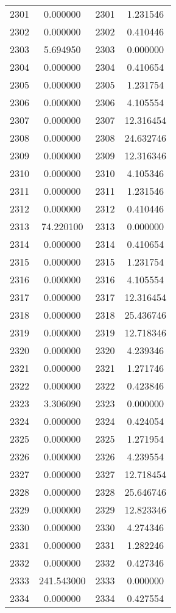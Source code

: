 \documentclass[12pt]{article}
\begin{document}
\begin{longtable}{@{}cccc@{}}
2301 & 0.000000 & 2301 & 1.231546 \\
2302 & 0.000000 & 2302 & 0.410446 \\
2303 & 5.694950 & 2303 & 0.000000 \\
2304 & 0.000000 & 2304 & 0.410654 \\
2305 & 0.000000 & 2305 & 1.231754 \\
2306 & 0.000000 & 2306 & 4.105554 \\
2307 & 0.000000 & 2307 & 12.316454 \\
2308 & 0.000000 & 2308 & 24.632746 \\
2309 & 0.000000 & 2309 & 12.316346 \\
2310 & 0.000000 & 2310 & 4.105346 \\
2311 & 0.000000 & 2311 & 1.231546 \\
2312 & 0.000000 & 2312 & 0.410446 \\
2313 & 74.220100 & 2313 & 0.000000 \\
2314 & 0.000000 & 2314 & 0.410654 \\
2315 & 0.000000 & 2315 & 1.231754 \\
2316 & 0.000000 & 2316 & 4.105554 \\
2317 & 0.000000 & 2317 & 12.316454 \\
2318 & 0.000000 & 2318 & 25.436746 \\
2319 & 0.000000 & 2319 & 12.718346 \\
2320 & 0.000000 & 2320 & 4.239346 \\
2321 & 0.000000 & 2321 & 1.271746 \\
2322 & 0.000000 & 2322 & 0.423846 \\
2323 & 3.306090 & 2323 & 0.000000 \\
2324 & 0.000000 & 2324 & 0.424054 \\
2325 & 0.000000 & 2325 & 1.271954 \\
2326 & 0.000000 & 2326 & 4.239554 \\
2327 & 0.000000 & 2327 & 12.718454 \\
2328 & 0.000000 & 2328 & 25.646746 \\
2329 & 0.000000 & 2329 & 12.823346 \\
2330 & 0.000000 & 2330 & 4.274346 \\
2331 & 0.000000 & 2331 & 1.282246 \\
2332 & 0.000000 & 2332 & 0.427346 \\
2333 & 241.543000 & 2333 & 0.000000 \\
2334 & 0.000000 & 2334 & 0.427554 \\

\end{longtable}
\end{document}
